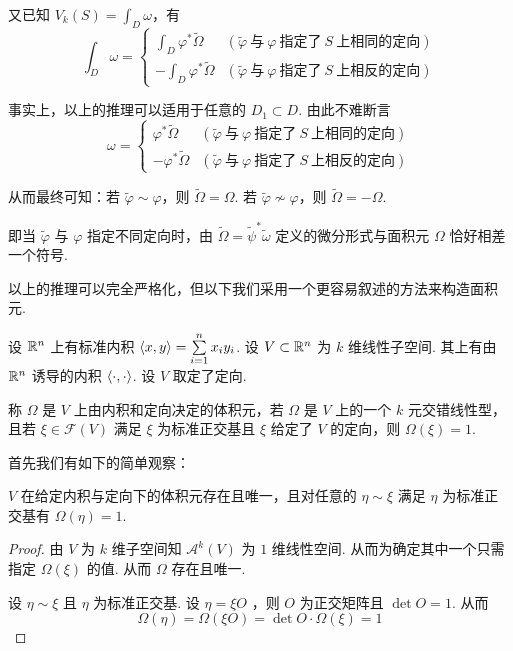 又已知 $V_k(S)=\displaystyle\int_D\omega$，有
$$
\int_D\omega=\begin{cases}
    \displaystyle\int_{D}\varphi^*\widetilde{\Omega} & (\widetilde{\varphi}~\text{与}~\varphi~\text{指定了}~S~\text{上相同的定向})\\
    \displaystyle-\int_{D}\varphi^*\widetilde{\Omega} & (\widetilde{\varphi}~\text{与}~\varphi~\text{指定了}~S~\text{上相反的定向})
\end{cases}
$$

事实上，以上的推理可以适用于任意的 $D_1\subset D$. 由此不难断言
$$
\omega=\begin{cases}
    \displaystyle\varphi^*\widetilde{\Omega} & (\widetilde{\varphi}~\text{与}~\varphi~\text{指定了}~S~\text{上相同的定向})\\
    \displaystyle-\varphi^*\widetilde{\Omega} & (\widetilde{\varphi}~\text{与}~\varphi~\text{指定了}~S~\text{上相反的定向})
\end{cases}
$$

从而最终可知：若 $\widetilde{\varphi}\sim\varphi$，则 $\widetilde{\Omega}=\Omega$. 若 $\widetilde{\varphi}\not\sim\varphi$，则 $\widetilde{\Omega}=-\Omega$.

即当 $\widetilde{\varphi}$ 与 $\varphi$ 指定不同定向时，由 $\widetilde{\Omega}=\widetilde{\psi}^*\widetilde{\omega}$ 定义的微分形式与面积元 $\Omega$ 恰好相差一个符号.

以上的推理可以完全严格化，但以下我们采用一个更容易叙述的方法来构造面积元.



设 $\mathbb{R}^n$ 上有标准内积 $\left\langle{x,y}\right\rangle=\sum\limits_{i=1}^nx_iy_i$. 设 $V\subset\mathbb{R}^n$ 为 $k$ 维线性子空间. 其上有由 $\mathbb{R}^n$ 诱导的内积 $\left\langle{\cdot,\cdot}\right\rangle$. 设 $V$ 取定了定向.

称 $\Omega$ 是 $V$ 上由内积和定向决定的体积元，若 $\Omega$ 是 $V$ 上的一个 $k$ 元交错线性型，且若 $\xi\in\mathscr{F}(V)$ 满足 $\xi$ 为标准正交基且 $\xi$ 给定了 $V$ 的定向，则 $\Omega(\xi)=1$.

首先我们有如下的简单观察：

\begin{property}
    $V$ 在给定内积与定向下的体积元存在且唯一，且对任意的 $\eta\sim\xi$ 满足 $\eta$ 为标准正交基有 $\Omega(\eta)=1$.
\end{property}
\begin{proof}
    由 $V$ 为 $k$ 维子空间知 $\mathscr{A}^k(V)$ 为 $1$ 维线性空间. 从而为确定其中一个只需指定 $\Omega(\xi)$ 的值. 从而 $\Omega$ 存在且唯一.

    设 $\eta\sim\xi$ 且 $\eta$ 为标准正交基. 设 $\eta=\xi O$ ，则 $O$ 为正交矩阵且 $\det O=1$. 从而
$$
\Omega(\eta)=\Omega(\xi O)=\det O\cdot\Omega(\xi)=1
$$
\end{proof}


